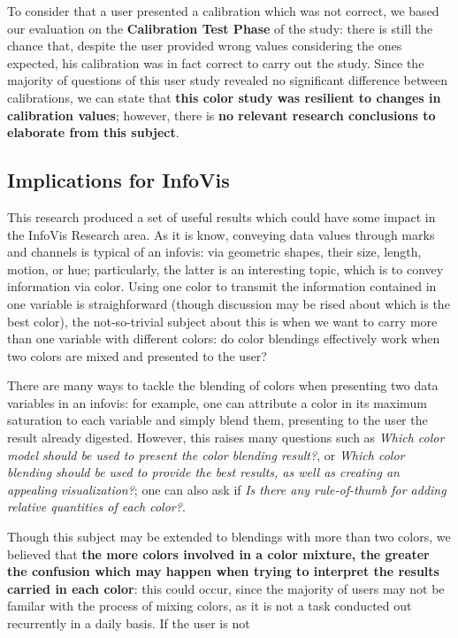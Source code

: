 %
To consider that a user presented a calibration which was not correct, we based our evaluation on the \textbf{Calibration Test Phase} of the
study: there is still the chance that, despite the user provided wrong values considering the ones expected, his calibration was in fact
correct to carry out the study. Since the majority of questions of this user study revealed no significant difference between calibrations,
we can state that \textbf{this color study was resilient to changes in calibration values}; however, there is \textbf{no relevant research
conclusions to elaborate from this subject}.
%
\subsection{Implications for InfoVis}
\label{subsec:results_discussion_infovis}
%
This research produced a set of useful results which could have some impact in the \gls{InfoVis} Research area. As it is know,
conveying data values through marks and channels is typical of an infovis: via geometric shapes, their size, length, motion, or hue;
particularly, the latter is an interesting topic, which is to convey information via color. Using one color to transmit the information
contained in one variable is straighforward (though discussion may be rised about which is the best color), the not-so-trivial subject about
this is when we want to carry more than one variable with different colors: do color blendings effectively work when two colors are mixed and
presented to the user? \par
%
There are many ways to tackle the blending of colors when presenting two data variables in an infovis: for example, one can attribute a color
in its maximum saturation to each variable and simply blend them, presenting to the user the result already digested. However, this raises
many questions such as \emph{Which color model should be used to present the color blending result?}, or \emph{Which color blending should be
used to provide the best results, as well as creating an appealing visualization?}; one can also ask if \emph{Is there any rule-of-thumb for
adding relative quantities of each color?}. \par
%
Though this subject may be extended to blendings with more than two colors, we believed that \textbf{the more colors involved in a color mixture,
the greater the confusion which may happen when trying to interpret the results carried in each color}: this could occur, since the majority of
users may not be familar with the process of mixing colors, as it is not a task conducted out recurrently in a daily basis. If the user is not
